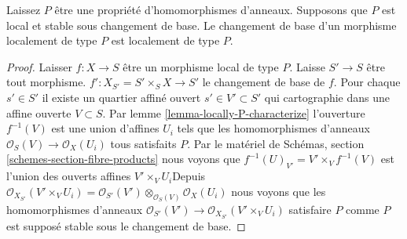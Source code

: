 \begin{lemma}

\label{lemma-base-change-type-P}
Laissez $P$ être une propriété d'homomorphismes d'anneaux. Supposons que $P$ est local et stable sous changement de base. Le changement de base d'un morphisme localement de type $P$ est localement de type $P$.
\end{lemma}

\begin{proof}

Laisser $f : X \to S$ être un morphisme local de type $P$. Laisse $S' \to S$ être tout morphisme.
$f' : X_{S'} = S' \times_S X \to S'$ le changement de base de $f$. Pour chaque $s' \in S'$ il existe un quartier affiné ouvert
$s' \in V' \subset S'$ qui cartographie dans une affine ouverte $V \subset S$. Par lemme \ref{lemma-locally-P-characterize} l'ouverture $f^{-1}(V)$ est une union d'affines $U_i$ tels que les homomorphismes d'anneaux
$\mathcal{O}_S(V) \to \mathcal{O}_X(U_i)$ tous satisfaits $P$. Par le matériel de Schémas, section \ref{schemes-section-fibre-products}
nous voyons que $f^{-1}(U)_{V'} = V' \times_V f^{-1}(V)$ est l'union des ouverts affines $V' \times_V U_i$Depuis $\mathcal{O}_{X_{S'}}(V' \times_V U_i) =
\mathcal{O}_{S'}(V') \otimes_{\mathcal{O}_S(V)} \mathcal{O}_X(U_i)$
nous voyons que les homomorphismes d'anneaux
$\mathcal{O}_{S'}(V') \to \mathcal{O}_{X_{S'}}(V' \times_V U_i)$
satisfaire $P$ comme $P$ est supposé stable sous le changement de base.

\end{proof}

